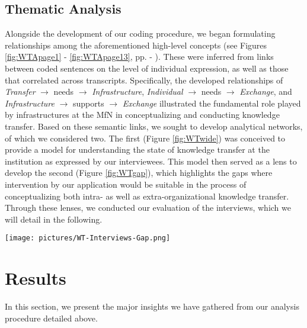 \documentclass{article}
\begin{document}
\subsection{Thematic Analysis}
Alongside the development of our coding procedure, we began formulating relationships among the aforementioned high-level concepts (see Figures \ref{fig:WTApage1} - \ref{fig:WTApage13}, pp. \pageref{fig:WTApage1} - \pageref{fig:WTApage13}). These were inferred from links between coded sentences on the level of individual expression, as well as those that correlated across transcripts. Specifically, the developed relationships of \textit{Transfer} $ \rightarrow $ needs $ \rightarrow $ \textit{Infrastructure}, \textit{Individual} $ \rightarrow $ needs $ \rightarrow $ \textit{Exchange}, and \textit{Infrastructure} $ \rightarrow $ supports $ \rightarrow $ \textit{Exchange} illustrated the fundamental role played by infrastructures at the MfN in conceptualizing and conducting knowledge transfer. Based on these semantic links, we sought to develop analytical networks, of which we considered two. The first (Figure \ref{fig:WTwide}) was conceived to provide a model for understanding the state of knowledge transfer at the institution as expressed by our interviewees. This model then served as a lens to develop the second (Figure \ref{fig:WTgap}), which highlights the gaps where intervention by our application would be suitable in the process of conceptualizing both intra- as well as extra-organizational knowledge transfer. Through these lenses, we conducted our evaluation of the interviews, which we will detail in the following.

\begin{figure*}[h!]
  \centering
  \texttt{[image: pictures/WT-Interviews-Gap.png]}
  \caption{\label{fig:WTgap}%
           Condensed focus on the specific gaps for intervention that emerged in thematic analysis.}
\end{figure*}

\section{Results}
In this section, we present the major insights we have gathered from our analysis procedure detailed above.
\end{document}
